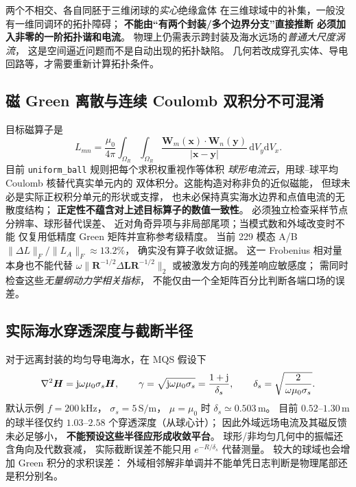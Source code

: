 两个不相交、各自同胚于三维闭球的\emph{实心}绝缘盒体
在三维球域中的补集，一般没有一维同调环的拓扑障碍；
\textbf{不能由“有两个封装/多个边界分支”直接推断
必须加入非零的一阶拓扑谐和电流}。
物理上仍需表示跨封装及海水远场的\emph{普通大尺度涡流}，
这是空间逼近问题而不是自动出现的拓扑缺陷。
几何若改成穿孔实体、导电回路等，才需要重新计算拓扑条件。

\subsection{磁 Green 离散与连续 Coulomb 双积分不可混淆}
目标磁算子是
\[
L_{mn}
=\frac{\mu_0}{4\pi}
\int_{\Omega_R}\int_{\Omega_R}
\frac{\bm W_m(\bm x)\cdot\bm W_n(\bm y)}
{|\bm x-\bm y|}\,\mathrm dV_y\mathrm dV_x.
\]
目前 \texttt{uniform\_ball} 规则把每个求积权重视作等体积
\emph{球形电流云}，用球--球平均 Coulomb 核替代真实单元内的
双体积分。这能构造对称非负的近似磁能，
但球未必是实际正权积分单元的形状或支撑，
也未必保持真实海水边界和点值电流的无散度结构；
\textbf{正定性不蕴含对上述目标算子的数值一致性}。
必须独立检查采样节点分辨率、球形替代误差、
近对角奇异项与非局部尾项；当模式数和外域改变时不能
仅复用低精度 Green 矩阵并宣称参考级精度。
当前 229 模态 A/B \(\|\Delta L\|_F/\|L_A\|_F\approx13.2\%\)，
确实没有算子收敛证据。
这一 Frobenius 相对量本身也不能代替
\(\omega\|\bm R^{-1/2}\Delta\bm L\bm R^{-1/2}\|_2\)
或被激发方向的残差响应敏感度；
需同时检查这些\emph{无量纲动力学相关指标}，
不能仅由一个全矩阵百分比判断各端口场的误差。

\subsection{实际海水穿透深度与截断半径}
对于远离封装的均匀导电海水，在 MQS 假设下
\[
\nabla^2\bm H=\mathrm j\omega\mu_0\sigma_s\bm H,\qquad
\gamma=\sqrt{\mathrm j\omega\mu_0\sigma_s}
=\frac{1+\mathrm j}{\delta_s},\qquad
\delta_s=\sqrt{\frac{2}{\omega\mu_0\sigma_s}}.
\]
默认示例 \(f=200\,\mathrm{kHz}\)，
\(\sigma_s=5\,\mathrm{S/m}\)，
\(\mu=\mu_0\) 时 \(\delta_s\simeq0.503\,\mathrm m\)。
目前 \(0.52\)--\(1.30\,\mathrm m\) 的球半径仅约
\(1.03\)--\(2.58\) 个穿透深度（从球心计）；
因此外域远场电流及其磁反馈未必足够小，
\textbf{不能预设这些半径应形成收敛平台}。
球形/非均匀几何中的振幅还含角向及代数衰减，
实际截断误差不能只用 \(e^{-R/\delta_s}\) 代替测量。
较大的球域也会增加 Green 积分的求积误差：
外域相邻解非单调并不能单凭日志判断是物理尾部还是积分别名。

